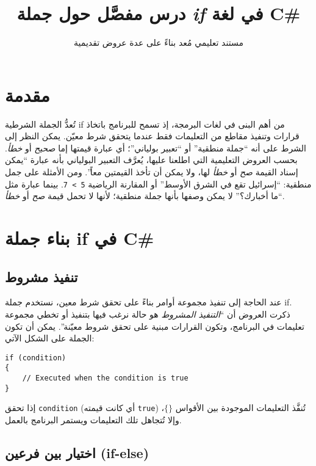 \documentclass[12pt]{article}
\begin{document}
\title{درس مفصَّل حول جملة \emph{\textenglish{if}} في لغة C\#}
\author{مستند تعليمي مُعد بناءً على عدة عروض تقديمية}
\date{}

\maketitle
\thispagestyle{fancy}

\section*{مقدمة}

تُعدُّ الجملة الشرطية \textenglish{if} من أهم البنى في لغات البرمجة، إذ تسمح للبرنامج باتخاذ قرارات وتنفيذ مقاطع من التعليمات فقط عندما يتحقق شرط معيّن. يمكن النظر إلى الشرط على أنه ``جملة منطقية'' أو ``تعبير بولياني''؛ أي عبارة قيمتها إما \emph{صحيح} أو \emph{خطأ}. بحسب العروض التعليمية التي اطلعنا عليها، يُعرَّف التعبير البولياني بأنه عبارة ``يمكن إسناد القيمة \emph{صح} أو \emph{خطأ} لها، ولا يمكن أن تأخذ القيمتين معاً''. ومن الأمثلة على جمل منطقية: ``إسرائيل تقع في الشرق الأوسط'' أو المقارنة الرياضية \verb|5 > 7|. بينما عبارة مثل ``ما أخبارك؟'' لا يمكن وصفها بأنها جملة منطقية؛ لأنها لا تحمل قيمة \emph{صح} أو \emph{خطأ}.

\section{بناء جملة \textenglish{if} في C\#}

\subsection{تنفيذ مشروط}

عند الحاجة إلى تنفيذ مجموعة أوامر بناءً على تحقق شرط معين، نستخدم جملة \textenglish{if}. ذكرت العروض أن ``\emph{التنفيذ المشروط} هو حالة نرغب فيها بتنفيذ أو تخطي مجموعة تعليمات في البرنامج، وتكون القرارات مبنية على تحقق شروط معيّنة''. يمكن أن تكون الجملة على الشكل الآتي:

\begin{english}
\begin{verbatim}
if (condition)
{
    // Executed when the condition is true
}
\end{verbatim}
\end{english}

إذا تحقق \verb|condition| (أي كانت قيمته \texttt{true}) تُنفَّذ التعليمات الموجودة بين الأقواس $\{\}$، وإلا تُتجاهل تلك التعليمات ويستمر البرنامج بالعمل.

\subsection{اختيار بين فرعين (\textenglish{if-else})}
\end{document}
